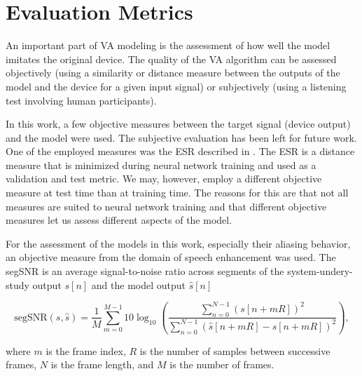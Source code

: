 \section{Evaluation Metrics}
\label{subsec:va_evaluation}

An important part of \ac{VA} modeling is the assessment of how well the model imitates the original device. The quality of the \ac{VA} algorithm can be assessed objectively (using a similarity or distance measure between the outputs of the model and the device for a given input signal) or subjectively (using a listening test involving human participants). 

In this work, a few objective measures between the target signal (device output) and the model were used. The subjective evaluation has been left for future work. One of the employed measures was the \ac{ESR} described in .
The \ac{ESR} is a distance measure that is minimized during neural network training and used as a validation and test metric. We may, however, employ a different objective measure at test time than at training time. The reasons for this are that not all measures are suited to neural network training and that different objective measures let us assess different aspects of the model.

For the assessment of the models in this work, especially their aliasing behavior, an objective measure from the domain of speech enhancement was used. The \ac{segSNR} is an average signal-to-noise ratio across segments of the system-undery-study output $s[n]$ and the model output $\hat{s}[n]$ \cite{Hansen98}

\begin{equation}
    \text{segSNR}(s, \hat{s}) = \frac{1}{M} \sum \limits_{m=0}^{M-1} 10 \log_{10} \left( \frac{\sum_{n=0}^{N-1} (s[n+mR])^2}{\sum_{n=0}^{N-1} (\hat{s}[n+mR] - s[n+mR])^2} \right),
    \label{eq:seg_snr}
\end{equation}

where $m$ is the frame index, $R$ is the number of samples between successive frames, $N$ is the frame length, and $M$ is the number of frames.



